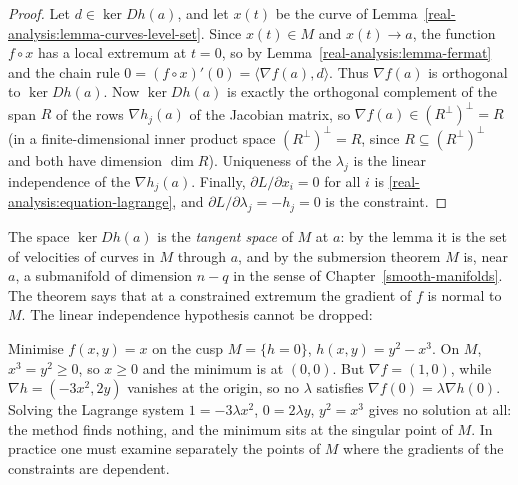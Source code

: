 \begin{proof}
Let $d \in \ker Dh(a)$, and let $x(t)$ be the curve of Lemma~\ref{real-analysis:lemma-curves-level-set}. Since $x(t) \in M$ and $x(t) \to a$, the function $f \circ x$ has a local extremum at $t = 0$, so
by Lemma~\ref{real-analysis:lemma-fermat} and the chain rule $0 = (f \circ x)'(0) = \langle\nabla f(a), d\rangle$. Thus $\nabla f(a)$ is orthogonal to $\ker Dh(a)$. Now $\ker Dh(a)$ is exactly the orthogonal
complement of the span $R$ of the rows $\nabla h_j(a)$ of the Jacobian matrix, so $\nabla f(a) \in (R^\perp)^\perp = R$ (in a finite-dimensional inner product space $(R^\perp)^\perp = R$, since
$R \subseteq (R^\perp)^\perp$ and both have dimension $\dim R$). Uniqueness of the $\lambda_j$ is the linear independence of the $\nabla h_j(a)$. Finally, $\partial L/\partial x_i = 0$ for all $i$ is
\eqref{real-analysis:equation-lagrange}, and $\partial L/\partial\lambda_j = -h_j = 0$ is the constraint.
\end{proof}

The space $\ker Dh(a)$ is the \emph{tangent space} of $M$ at $a$: by the lemma it is the set of velocities of curves in $M$ through $a$, and by the submersion theorem $M$ is, near $a$, a submanifold of
dimension $n - q$ in the sense of Chapter~\ref{smooth-manifolds}. The theorem says that at a constrained extremum the gradient of $f$ is normal to $M$. The linear independence hypothesis
cannot be dropped:

\begin{counterexample}\label{real-analysis:counterexample-lagrange-cusp}
Minimise $f(x, y) = x$ on the cusp $M = \{h = 0\}$, $h(x, y) = y^2 - x^3$. On $M$, $x^3 = y^2 \geq 0$, so $x \geq 0$ and the minimum is at $(0, 0)$. But $\nabla f = (1, 0)$, while
$\nabla h = (-3x^2, 2y)$ vanishes at the origin, so no $\lambda$ satisfies $\nabla f(0) = \lambda\nabla h(0)$. Solving the Lagrange system $1 = -3\lambda x^2$, $0 = 2\lambda y$, $y^2 = x^3$ gives no solution at all:
the method finds nothing, and the minimum sits at the singular point of $M$. In practice one must examine separately the points of $M$ where the gradients of the constraints are dependent.
\end{counterexample}

